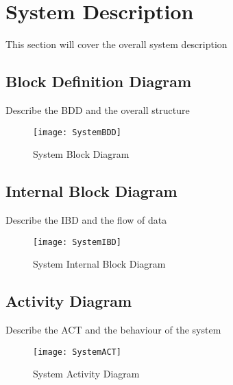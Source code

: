 \documentclass[Main]{subfiles}
\begin{document}
\section{System Description} %
\label{sec:system_description}

	This section will cover the overall system description
	
	\subsection{Block Definition Diagram} %
	\label{sub:system_bdd}

		Describe the BDD and the overall structure
	
		\begin{figure}[H]
			\centering
			\texttt{[image: SystemBDD]}
			\caption{System Block Diagram}
			\label{fig:systembdd}
		\end{figure}
		
	\subsection{Internal Block Diagram} %
	\label{sub:system_ibd}
	
		Describe the IBD and the flow of data
		\begin{figure}[H]
			\centering
			\texttt{[image: SystemIBD]}
			\caption{System Internal Block Diagram}
			\label{fig:systemibd}
		\end{figure}

	\subsection{Activity Diagram} %
	\label{sub:system_act}
	
		Describe the ACT and the behaviour of the system
		\begin{figure}[H]
			\centering
			\texttt{[image: SystemACT]}
			\caption{System Activity Diagram}
			\label{fig:systemact}
		\end{figure}

\end{document}

